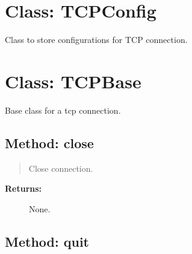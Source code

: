 %
%

\hypertarget{qconnectbase-tcp-tcp-base-class-tcpconfig-64}{%
\section{Class: TCPConfig}\label{qconnectbase-tcp-tcp-base-class-tcpconfig-64}}

\begin{Shaded}
\begin{Highlighting}[]
\end{Highlighting}
\end{Shaded}

Class to store configurations for TCP connection.

\hypertarget{qconnectbase-tcp-tcp-base-class-tcpbase-65}{%
\section{Class: TCPBase}\label{qconnectbase-tcp-tcp-base-class-tcpbase-65}}

\begin{Shaded}
\begin{Highlighting}[]
\end{Highlighting}
\end{Shaded}

Base class for a tcp connection.

\hypertarget{qconnectbase-tcp-tcp-base-method-close-66}{%
\subsection{Method: close}\label{qconnectbase-tcp-tcp-base-method-close-66}}

\begin{quote}
Close connection.
\end{quote}

\begin{description}
\item[\textbf{Returns:}]
None.
\end{description}

\hypertarget{qconnectbase-tcp-tcp-base-method-quit-67}{%
\subsection{Method: quit}\label{qconnectbase-tcp-tcp-base-method-quit-67}}

